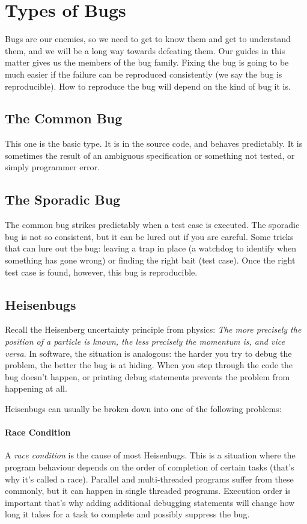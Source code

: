 \section*{Types of Bugs}
Bugs are our enemies, so we need to get to know them and get to understand them, and we will be a long way towards defeating them. Our guides in this matter \cite{dgtd} gives us the members of the bug family. Fixing the bug is going to be much easier if the failure can be reproduced consistently (we say the bug is reproducible). How to reproduce the bug will depend on the kind of bug it is.

\subsection*{The Common Bug}
This one is the basic type. It is in the source code, and behaves predictably. It is sometimes the result of an ambiguous specification or something not tested, or simply programmer error.

\subsection*{The Sporadic Bug}
The common bug strikes predictably when a test case is executed. The sporadic bug is not so consistent, but it can be lured out if you are careful. Some tricks that can lure out the bug: leaving a trap in place (a watchdog to identify when something has gone wrong) or finding the right bait (test case). Once the right test case is found, however, this bug is reproducible.

\subsection*{Heisenbugs}

Recall the Heisenberg uncertainty principle from physics: \textit{The more precisely the position of a particle is known, the less precisely the momentum is, and vice versa}. In software, the situation is analogous: the harder you try to debug the problem, the better the bug is at hiding. When you step through the code the bug doesn't happen, or printing debug statements prevents the problem from happening at all. 

Heisenbugs can usually be broken down into one of the following problems:

\paragraph{Race Condition}
A \emph{race condition} is the cause of most Heisenbugs. This is a situation where the program behaviour depends on the order of completion of certain tasks (that's why it's called a race). Parallel and multi-threaded programs suffer from these commonly, but it can happen in single threaded programs. Execution order is important that's why adding additional debugging statements will change how long it takes for a task to complete and possibly suppress the bug.

